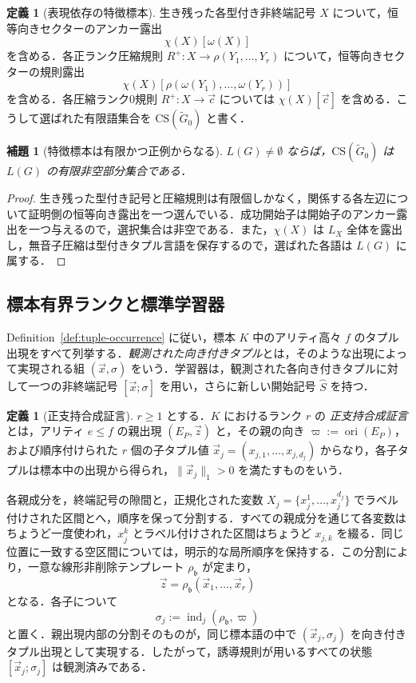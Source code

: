 \documentclass[11pt,a4paper]{ltjsarticle}
\numberwithin{equation}{section}
\theoremstyle{plain}
\newtheorem{lemma}[theorem]{補題}
\theoremstyle{definition}
\newtheorem{definition}[theorem]{定義}
\theoremstyle{remark}
\newcommand{\CS}{\mathrm{CS}}
\newcommand{\tuple}[1]{\vec{#1}}
\begin{document}
\begin{definition}[表現依存の特徴標本]
\label{def:cs}
生き残った各型付き非終端記号 \(X\) について，恒等向きセクターのアンカー露出
\[
  \chi(X)[\omega(X)]
\]
を含める．各正ランク圧縮規則
\(R^+:X\to\rho(Y_1,\ldots,Y_r)\)
について，恒等向きセクターの規則露出
\[
  \chi(X)[\rho(\omega(Y_1),\ldots,\omega(Y_r))]
\]
を含める．各圧縮ランク0規則 \(R^+:X\to\tuple c\) については
\(\chi(X)[\tuple c]\) を含める．こうして選ばれた有限語集合を
\(\CS(\widetilde G_0)\)
と書く．
\end{definition}

\begin{lemma}[特徴標本は有限かつ正例からなる]
\label{lem:cs-positive}
\(L(G)\ne\emptyset\) ならば，\(\CS(\widetilde G_0)\) は \(L(G)\) の有限非空部分集合である．
\end{lemma}

\begin{proof}
生き残った型付き記号と圧縮規則は有限個しかなく，関係する各左辺について証明側の恒等向き露出を一つ選んでいる．成功開始子は開始子のアンカー露出を一つ与えるので，選択集合は非空である．また，\(\chi(X)\) は \(L_X\) 全体を露出し，無音子圧縮は型付きタプル言語を保存するので，選ばれた各語は \(L(G)\) に属する．
\end{proof}

\subsection{標本有界ランクと標準学習器}

Definition~\ref{def:tuple-occurrence} に従い，標本 \(K\) 中のアリティ高々 \(f\) のタプル出現をすべて列挙する．\emph{観測された向き付きタプル}とは，そのような出現によって実現される組 \((\tuple x,\sigma)\) をいう．学習器は，観測された各向き付きタプルに対して一つの非終端記号 \([\tuple x;\sigma]\) を用い，さらに新しい開始記号 \(\widehat S\) を持つ．

\begin{definition}[正支持合成証言]
\label{def:composition-witness}
\(r\ge1\) とする．\(K\) におけるランク \(r\) の \emph{正支持合成証言}とは，アリティ \(e\le f\) の親出現 \((E_P,\tuple z)\) と，その親の向き
\(\varpi:=\operatorname{ori}(E_P)\)，および順序付けられた \(r\) 個の子タプル値
\(\tuple x_j=(x_{j,1},\ldots,x_{j,d_j})\)
からなり，各子タプルは標本中の出現から得られ，\(\|\tuple x_j\|_1>0\) を満たすものをいう．

各親成分を，終端記号の隙間と，正規化された変数
\(X_j=\{x_j^1,\ldots,x_j^{d_j}\}\)
でラベル付けされた区間とへ，順序を保って分割する．すべての親成分を通じて各変数はちょうど一度使われ，\(x_j^k\) とラベル付けされた区間はちょうど \(x_{j,k}\) を綴る．同じ位置に一致する空区間については，明示的な局所順序を保持する．この分割により，一意な線形非削除テンプレート \(\rho_{\mathfrak b}\) が定まり，
\[
  \tuple z=\rho_{\mathfrak b}(\tuple x_1,\ldots,\tuple x_r)
\]
となる．各子について
\[
  \sigma_j:=\operatorname{ind}_j(\rho_{\mathfrak b},\varpi)
\]
と置く．親出現内部の分割そのものが，同じ標本語の中で \((\tuple x_j,\sigma_j)\) を向き付きタプル出現として実現する．したがって，誘導規則が用いるすべての状態 \([\tuple x_j;\sigma_j]\) は観測済みである．
\end{definition}
\end{document}
